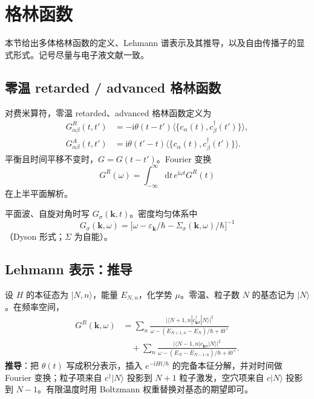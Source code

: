 \section{格林函数}

本节给出多体格林函数的定义、Lehmann 谱表示及其推导，以及自由传播子的显式形式。记号尽量与电子液文献一致。

\subsection{零温 retarded / advanced 格林函数}

对费米算符，零温 retarded、advanced 格林函数定义为
\begin{equation}
\begin{aligned}
  G^R_{\alpha\beta}(t,t')
  &=-\mathrm{i}\theta(t-t')
  \bigl\langle\bigl\{c_\alpha(t),c_\beta^\dagger(t')\bigr\}\bigr\rangle,\\
  G^A_{\alpha\beta}(t,t')
  &=\mathrm{i}\theta(t'-t)
  \bigl\langle\bigl\{c_\alpha(t),c_\beta^\dagger(t')\bigr\}\bigr\rangle.
\end{aligned}
\end{equation}
平衡且时间平移不变时，$G=G(t-t')$。Fourier 变换
\begin{equation}
  G^{R}(\omega)
  =\int_{-\infty}^{\infty}\mathrm{d}t\,e^{\mathrm{i}\omega t}G^{R}(t)
\end{equation}
在上半平面解析。

平面波、自旋对角时写 $G_\sigma(\mathbf{k},t)$。密度均匀体系中
\begin{equation}
  G_\sigma(\mathbf{k},\omega)
  =\bigl[
  \omega-\varepsilon_{\mathbf{k}}/\hbar
  -\Sigma_\sigma(\mathbf{k},\omega)/\hbar
  \bigr]^{-1}
\end{equation}
（Dyson 形式；$\Sigma$ 为自能）。

\subsection{Lehmann 表示：推导}

设 $H$ 的本征态为 $|N,n\rangle$，能量 $E_{N,n}$，化学势 $\mu$。零温、粒子数 $N$ 的基态记为 $|N\rangle$。在频率空间，
\begin{equation}
\begin{aligned}
  G^R(\mathbf{k},\omega)
  &=\sum_n
  \frac{
  \bigl|\langle N+1,n|c_{\mathbf{k}\sigma}^\dagger|N\rangle\bigr|^2
  }{\omega-(E_{N+1,n}-E_N)/\hbar+\mathrm{i}0^+}\\
  &\quad
  +\sum_n
  \frac{
  \bigl|\langle N-1,n|c_{\mathbf{k}\sigma}|N\rangle\bigr|^2
  }{\omega-(E_N-E_{N-1,n})/\hbar+\mathrm{i}0^+}.
\end{aligned}
\label{eq:lehmannG}
\end{equation}
\textbf{推导}：把 $\theta(t)$ 写成积分表示，插入 $e^{-\mathrm{i}Ht/\hbar}$ 的完备本征分解，并对时间做 Fourier 变换；粒子项来自 $c^\dagger|N\rangle$ 投影到 $N+1$ 粒子激发，空穴项来自 $c|N\rangle$ 投影到 $N-1$。有限温度时用 Boltzmann 权重替换对基态的期望即可。

